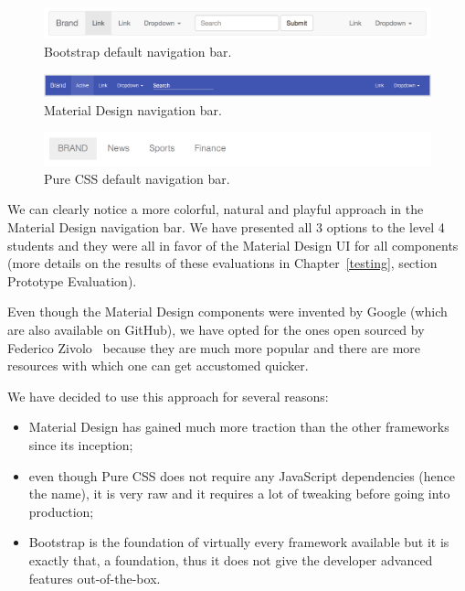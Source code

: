 \documentclass{l4proj}
\begin{document}
\begin{figure}[!ht]
    \centering
    \includegraphics[scale=0.35]{bootstrap-navbar}
    \caption{Bootstrap default navigation bar.}
    \label{fig:bootstrap-navbar}
\end{figure}

\begin{figure}[!ht]
    \centering
    \includegraphics[scale=0.35]{material-design-navbar}
    \caption{Material Design navigation bar.}
    \label{fig:material-design-navbar}
\end{figure}

\begin{figure}[!ht]
    \centering
    \includegraphics[scale=0.35]{purecss-navbar}
    \caption{Pure CSS default navigation bar.}
    \label{fig:purecss-navbar}
\end{figure}

We can clearly notice a more colorful, natural and playful approach in the Material Design navigation bar. We have
presented all 3 options to the level 4 students and they were all in favor of the Material Design UI for all components
(more details on the results of these evaluations in Chapter~\ref{testing}, section Prototype Evaluation).

Even though the Material Design components were invented by Google (which are also available on GitHub), we have opted for the ones open sourced by Federico
Zivolo~\cite{material-design} because they are much more popular and there are more resources with which one can get
accustomed quicker. 

We have decided to use this approach for several reasons:

\begin{itemize}
    \item Material Design has gained much more traction than the other frameworks since its inception;
    \item even though Pure CSS does not require any JavaScript dependencies (hence the name), it is very raw and it
	requires a lot of tweaking before going into production;
    \item Bootstrap is the foundation of virtually every framework available but it is exactly that, a foundation, thus
	it does not give the developer advanced features out-of-the-box.
\end{itemize}
\end{document}
